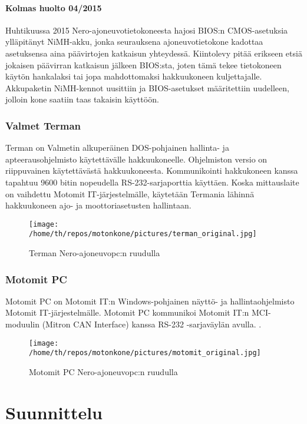 \documentclass[11pt,a4paper,oneside,article]{memoir}
\begin{document}
\subsubsection{Kolmas huolto 04/2015}
Huhtikuussa 2015 Nero-ajoneuvotietokoneesta hajosi BIOS:n CMOS-asetuksia ylläpitänyt NiMH-akku, jonka seurauksena ajoneuvotietokone kadottaa asetuksensa aina päävirtojen katkaisun yhteydessä. Kiintolevy pitää erikseen etsiä jokaisen päävirran katkaisun jälkeen BIOS:sta, joten tämä tekee tietokoneen käytön hankalaksi tai jopa mahdottomaksi hakkuukoneen kuljettajalle. Akkupaketin NiMH-kennot uusittiin ja BIOS-asetukset määritettiin uudelleen, jolloin kone saatiin taas takaisin käyttöön.

\subsection{Valmet Terman}
Terman on Valmetin alkuperäinen DOS-pohjainen hallinta- ja apteerausohjelmisto käytettävälle hakkuukoneelle. Ohjelmiston versio on riippuvainen käytettävästä hakkuukoneesta. Kommunikointi hakkukoneen kanssa tapahtuu 9600 bitin nopeudella RS-232-sarjaporttia käyttäen. Koska mittauslaite on vaihdettu Motomit IT-järjestelmälle, käytetään Termania lähinnä hakkuukoneen ajo- ja moottoriasetusten hallintaan.

\begin{figure}[H]
\centering
\texttt{[image: /home/th/repos/motonkone/pictures/terman\_original.jpg]}
\caption{Terman Nero-ajoneuvopc:n ruudulla}
\end{figure}

\subsection{Motomit PC}
Motomit PC on Motomit IT:n Windows-pohjainen näyttö- ja hallintaohjelmisto Motomit IT-järjestelmälle. Motomit PC kommunikoi Motomit IT:n MCI-moduulin (Mitron CAN Interface) kanssa RS-232 -sarjaväylän avulla. \cite{motomit:esite}.

\begin{figure}[H]
\centering
\texttt{[image: /home/th/repos/motonkone/pictures/motomit\_original.jpg]}
\caption{Motomit PC Nero-ajoneuvopc:n ruudulla}
\end{figure}

\newpage
\chapter{Suunnittelu}
\end{document}
